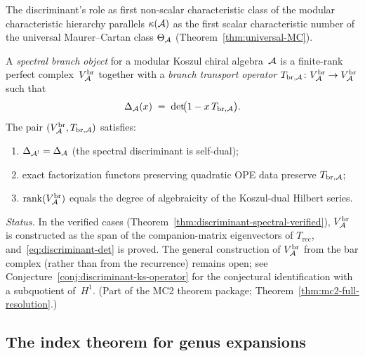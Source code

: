 \begin{remark}
The discriminant's role as first non-scalar characteristic class
of the modular characteristic hierarchy parallels $\kappa(\mathcal{A})$ as the first
scalar characteristic number of the universal Maurer--Cartan
class $\Theta_{\mathcal{A}}$ (Theorem~\ref{thm:universal-MC}).
\end{remark}

\begin{definition}
\label{def:spectral-branch-object}
A \emph{spectral branch object} for a modular Koszul chiral
algebra~$\mathcal{A}$ is a finite-rank perfect complex~$V_{\mathcal{A}}^{\mathrm{br}}$
together with a \emph{branch transport operator}
$T_{\mathrm{br},\mathcal{A}} \colon V_{\mathcal{A}}^{\mathrm{br}} \to
V_{\mathcal{A}}^{\mathrm{br}}$ such that
\begin{equation}\label{eq:discriminant-det}
\Delta_{\mathcal{A}}(x)
\;=\;
\det\!\bigl(1 - x\, T_{\mathrm{br},\mathcal{A}}\bigr).
\end{equation}
The pair $(V_{\mathcal{A}}^{\mathrm{br}}, T_{\mathrm{br},\mathcal{A}})$ satisfies:
\begin{enumerate}[label=\textup{(\roman*)}]
\item $\Delta_{\mathcal{A}^!} = \Delta_{\mathcal{A}}$
  (the spectral discriminant is self-dual);
\item exact factorization functors preserving quadratic OPE data
  preserve $T_{\mathrm{br},\mathcal{A}}$;
\item $\operatorname{rank}(V_{\mathcal{A}}^{\mathrm{br}})$
  equals the degree of algebraicity of the Koszul-dual
  Hilbert series.
\end{enumerate}

\smallskip\noindent
\emph{Status.}
In the verified cases (Theorem~\ref{thm:discriminant-spectral-verified}),
$V_{\mathcal{A}}^{\mathrm{br}}$ is constructed as the span of the
companion-matrix eigenvectors of $T_{\mathrm{rec}}$,
and~\eqref{eq:discriminant-det} is proved.  The general
construction of $V_{\mathcal{A}}^{\mathrm{br}}$ from the bar complex
(rather than from the recurrence) remains open; see
Conjecture~\ref{conj:discriminant-ks-operator} for the
conjectural identification with a subquotient of~$H^1$.
(Part of the MC2 theorem package; Theorem~\ref{thm:mc2-full-resolution}.)
\end{definition}

\subsection{The index theorem for genus expansions}

